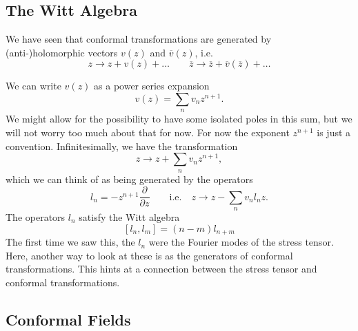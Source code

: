 
\subsection{The Witt Algebra}%
\label{sub:the_witt_algebra}

We have seen that conformal transformations are generated by (anti-)holomorphic vectors $v(z)$ and $\overline{v}{}(z)$, i.e.
\begin{equation}
  z \to z + v(z) + \dots \qquad \overline{z}{} \to \overline{z}{} + \overline{v}{}(\overline{z}{}) + \dots
\end{equation}

We can write $v(z)$ as a power series expansion
\begin{equation}
  v(z) = \sum_{n} v_n z^{n+1}.
\end{equation}
We might allow for the possibility to have some isolated poles in this sum, but we will not worry too much about that for now.
For now the exponent $z^{n+1}$ is just a convention.
Infinitesimally, we have the transformation
\begin{equation}
  z \to z + \sum_{n} v_n z^{n+1},
\end{equation}
which we can think of as being generated by the operators
\begin{equation}
  l_n = -z^{n+1} \frac{\partial }{\partial z} \qquad \text{i.e.} \quad z \to z - \sum_{n} v_n l_n z.
\end{equation}
The operators $l_n$  satisfy the Witt algebra
\begin{equation}
  \boxed{[l_n, l_m] = (n-m)l_{n+m}}
\end{equation}
The first time we saw this, the $l_n$  were the Fourier modes of the stress tensor. Here, another way to look at these is as the generators of conformal transformations.
This hints at a connection between the stress tensor and conformal transformations.

\subsection{Conformal Fields}%
\label{sub:conformal_fields}

